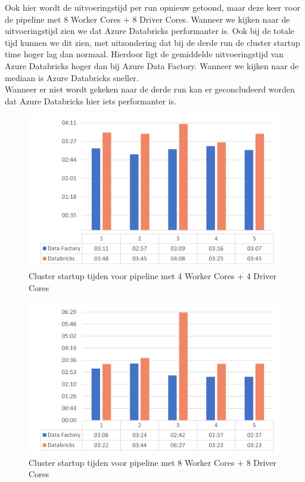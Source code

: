 Ook hier wordt de uitvoeringstijd per run opnieuw getoond, maar deze keer voor de pipeline met 8 Worker Cores + 8 Driver Cores. Wanneer we kijken naar de uitvoeringstijd zien we dat Azure Databricks performanter is. Ook bij de totale tijd kunnen we dit zien, met uitzondering dat bij de derde run de cluster startup time hoger lag dan normaal. Hierdoor ligt de gemiddelde uitvoeringstijd van Azure Databricks hoger dan bij Azure Data Factory. Wanneer we kijken naar de mediaan is Azure Databricks sneller.\\

Wanneer er niet wordt gekeken naar de derde run kan er geconcludeerd worden dat Azure Databricks hier iets performanter is.


\begin{figure}[H]
    \centering
    \includegraphics[width=1\textwidth]{./graphics/kosten/graf5_update.png}
    \caption{Cluster startup tijden voor pipeline met 4 Worker Cores + 4 Driver Cores}
\end{figure}

\begin{figure}[H]
    \centering
    \includegraphics[width=1\textwidth]{./graphics/kosten/graf6_update.png}
    \caption{Cluster startup tijden voor pipeline met 8 Worker Cores + 8 Driver Cores}
\end{figure}


